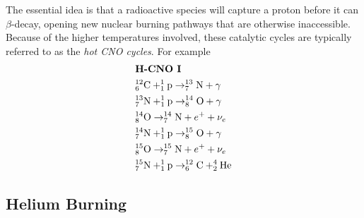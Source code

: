 \par The essential idea is that a radioactive species will capture a proton before it can $\beta$-decay, opening new nuclear burning pathways that are otherwise inaccessible. Because of the higher temperatures involved, these catalytic cycles are typically referred to as the \emph{hot CNO cycles}. For example
\begin{align*}
    & \text{\textbf{H-CNO I}}\\
    & \element{C}{12}{6}+\element{p}{1}{1}\to\element{N}{13}{7}+\gamma\\
    & \element{N}{13}{7}+\element{p}{1}{1}\to\element{O}{14}{8}+\gamma\\
    & \element{O}{14}{8}\to\element{N}{14}{7}+e^{+}+\nu_{e}\\
    & \element{N}{14}{7}+\element{p}{1}{1}\to\element{O}{15}{8}+\gamma\\
    & \element{O}{15}{8}\to\element{N}{15}{7}+e^{+}+\nu_{e}\\
    & \element{N}{15}{7}+\element{p}{1}{1}\to\element{C}{12}{6}+\element{He}{4}{2}
\end{align*}

\subsection{Helium Burning}

